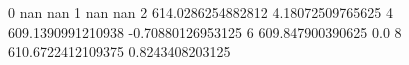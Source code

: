 0 nan nan
1 nan nan
2 614.0286254882812 4.18072509765625
4 609.1390991210938 -0.70880126953125
6 609.847900390625 0.0
8 610.6722412109375 0.8243408203125
